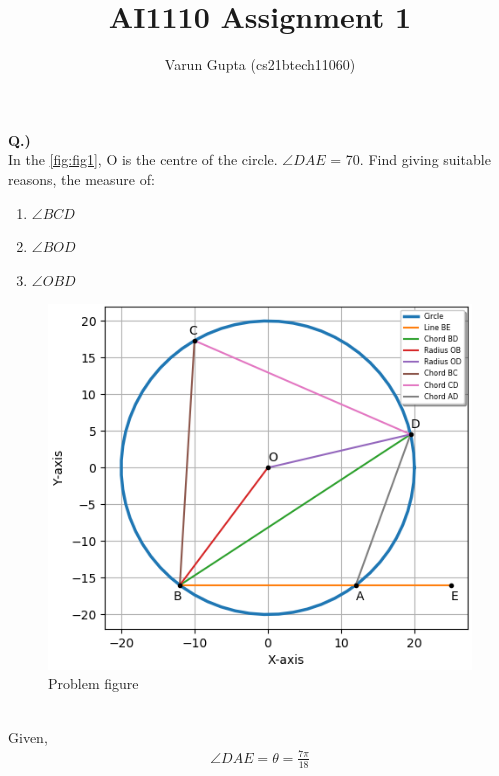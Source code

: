 \documentclass[journal,12pt,twocolumn]{IEEEtran}
\begin{document}
\let\StandardTheFigure\thefigure
\let\vec\mathbf
\def\putbox#1#2#3{\makebox[0in][l]{\makebox[#1][l]{}\raisebox{\baselineskip}[0in][0in]{\raisebox{#2}[0in][0in]{#3}}}}
\def\rightbox#1{\makebox[0in][r]{#1}}
\def\centbox#1{\makebox[0in]{#1}}
\def\topbox#1{\raisebox{-\baselineskip}[0in][0in]{#1}}
\def\midbox#1{\raisebox{-0.5\baselineskip}[0in][0in]{#1}}
\vspace{3cm}
\title{AI1110 Assignment 1}
\author{Varun Gupta (cs21btech11060)}
\maketitle
\newpage
\textbf{Q.)}\\
In the \autoref{fig:fig1}, O is the centre of the circle. $\angle{DAE}$ = 70\textdegree. Find giving suitable reasons, the measure of:
\begin{enumerate}
    \item $\angle{BCD}$
    \item $\angle{BOD}$
    \item $\angle{OBD}$
\end{enumerate}
\begin{figure}[ht!]
    \centering
    \includegraphics[width=\columnwidth]{figs/plot.png}
    \caption[]{Problem figure}
    \label{fig:fig1}
\end{figure}
\solution\\
Given,
\begin{align}
    \angle{DAE} = \theta = \frac{7\pi}{18}
\end{align}
\end{document}
